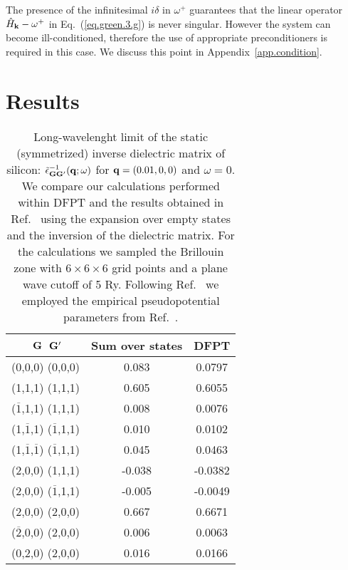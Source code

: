 \documentclass[twocolumn,prb,showpacs,superscriptaddress]{revtex4}
\def\w{\omega}
\def\H{\hat{H}}
\def\q{{\bf q}}
\def\k{{\bf k}}
\def\G{{\bf G}}
\def\Gp{{\bf G^\prime}}
\def\mo{$\overline{1}$}
\def\mt{$\overline{2}$}
\begin{document}
The presence of the infinitesimal $i\delta$ in $\w^+$ 
guarantees that the linear operator $\H_\k-\w^+$ in Eq.\ (\ref{eq.green.3.g}) is never singular.
However the system can become ill-conditioned, therefore the use of appropriate
preconditioners is required in this case. We discuss this point
in Appendix~\ref{app.condition}.
 

\section{Results}

\begin{table}[b!]
\caption{\label{tab.1} Long-wavelenght limit of the static (symmetrized)
inverse dielectric matrix of silicon: $\tilde\epsilon^{-1}_{\G\Gp}(\q;\w)$ for
$\q=(0.01,0,0)$ and $\w=0$. We compare our calculations performed within
DFPT and the results obtained in Ref.\ 
using the expansion over empty states and the inversion of the dielectric matrix.
For the calculations we sampled the Brillouin zone with $6\times6\times6$ grid
points and a plane wave cutoff of 5 Ry. Following Ref.\ 
we employed the empirical pseudopotential parameters from Ref.\ .
\vspace{0.5cm}}
\begin{tabular}{c c c}
\hline
\hline
$\,\,\G$\phantom{ciao} $\,\Gp$   & Sum over states\cite{balde_tosa}  &  DFPT  \\
\hline
    (0,0,0) (0,0,0)   & \phantom{-}0.083    &  \phantom{-}0.0797  \\
 (1,1,1)  (1,1,1)     &   \phantom{-}0.605  & \phantom{-}0.6055 \\
(\mo,1,1) (1,1,1)     &   \phantom{-}0.008  & \phantom{-}0.0076 \\
 (1,\mo,1) (\mo,1,1)  & \phantom{-}0.010    & \phantom{-}0.0102 \\
 (1,\mo,\mo) (\mo,1,1)& \phantom{-}0.045    & \phantom{-}0.0463 \\
 (2,0,0) (1,1,1)      &    -0.038           & -0.0382 \\
 (2,0,0) (\mo,1,1)    &    -0.005           & -0.0049 \\
 (2,0,0) (2,0,0)      &  \phantom{-}0.667   & \phantom{-}0.6671 \\
 (\mt,0,0) (2,0,0)    & \phantom{-}0.006    & \phantom{-}0.0063 \\
 (0,2,0) (2,0,0)      &  \phantom{-}0.016   & \phantom{-}0.0166 \\
\hline
\hline
\end{tabular}
\end{table}
\end{document}
